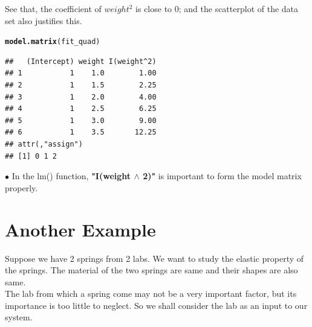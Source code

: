 \documentclass[11pt, a4paper]{article}\usepackage[]{graphicx}\usepackage[]{xcolor}
\makeatletter
\newcommand{\hldef}[1]{\textcolor[rgb]{0.345,0.345,0.345}{#1}}%
\newcommand{\hlkwd}[1]{\textcolor[rgb]{0.737,0.353,0.396}{\textbf{#1}}}%
\newenvironment{kframe}{%
 \def\at@end@of@kframe{}%
 \ifinner\ifhmode%
  \def\at@end@of@kframe{\end{minipage}}%
  \begin{minipage}{\columnwidth}%
 \fi\fi%
 \def\FrameCommand##1{\hskip\@totalleftmargin \hskip-\fboxsep
 \colorbox{shadecolor}{##1}\hskip-\fboxsep
     \hskip-\linewidth \hskip-\@totalleftmargin \hskip\columnwidth}%
 \MakeFramed {\advance\hsize-\width
   \@totalleftmargin\z@ \linewidth\hsize
   \@setminipage}}%
 {\par\unskip\endMakeFramed%
 \at@end@of@kframe}
\newenvironment{knitrout}{}{} %
\makeatother
\begin{document}
See that, the coefficient of $weight^2$ is close to 0; and the scatterplot of the data set also justifies this.

\begin{knitrout}
\color{fgcolor}\begin{kframe}
\begin{alltt}
\hlkwd{model.matrix}\hldef{(fit_quad)}
\end{alltt}
\begin{verbatim}
##   (Intercept) weight I(weight^2)
## 1           1    1.0        1.00
## 2           1    1.5        2.25
## 3           1    2.0        4.00
## 4           1    2.5        6.25
## 5           1    3.0        9.00
## 6           1    3.5       12.25
## attr(,"assign")
## [1] 0 1 2
\end{verbatim}
\end{kframe}
\end{knitrout}

$\bullet$ In the lm() function, \textbf{"I(weight $\wedge$ 2)"} is important to form the model matrix properly.


\newpage

\section*{Another Example}

Suppose we have 2 springs from 2 labs. We want to study the elastic property of the springs. The material of the two springs are same and their shapes are also same.\\

The lab from which a spring come may not be a very important factor, but its importance is too little to neglect. So we shall consider the lab as an input to our system. \\
\end{document}
